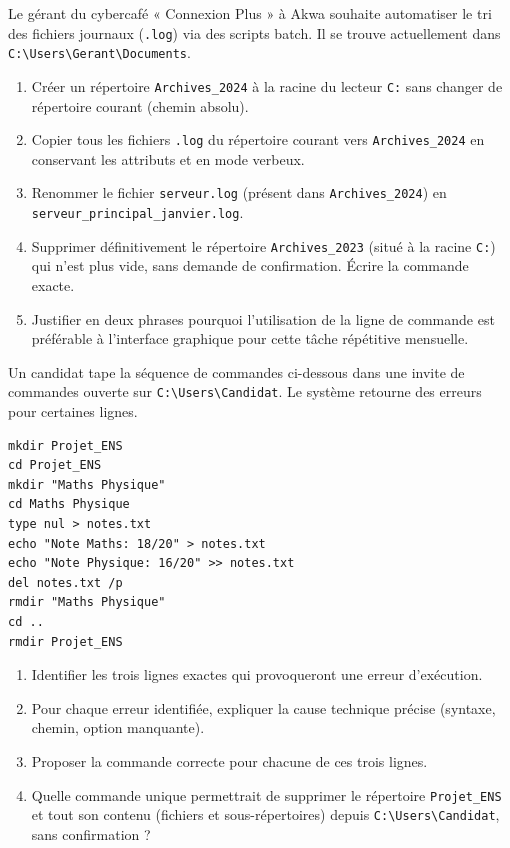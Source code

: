 \documentclass[11pt]{article}
\begin{document}
\begin{exercice}
Le gérant du cybercafé « Connexion Plus » à Akwa souhaite automatiser le tri des fichiers journaux (\texttt{.log}) via des scripts batch. Il se trouve actuellement dans \texttt{C:\textbackslash Users\textbackslash Gerant\textbackslash Documents}.
\begin{enumerate}
    \item Créer un répertoire \texttt{Archives\_2024} à la racine du lecteur \texttt{C:} sans changer de répertoire courant (chemin absolu).
    \item Copier tous les fichiers \texttt{.log} du répertoire courant vers \texttt{Archives\_2024} en conservant les attributs et en mode verbeux.
    \item Renommer le fichier \texttt{serveur.log} (présent dans \texttt{Archives\_2024}) en \texttt{serveur\_principal\_janvier.log}.
    \item Supprimer définitivement le répertoire \texttt{Archives\_2023} (situé à la racine \texttt{C:}) qui n'est plus vide, sans demande de confirmation. Écrire la commande exacte.
    \item Justifier en deux phrases pourquoi l'utilisation de la ligne de commande est préférable à l'interface graphique pour cette tâche répétitive mensuelle.
\end{enumerate}
\end{exercice}

\begin{exercice}
Un candidat tape la séquence de commandes ci-dessous dans une invite de commandes ouverte sur \texttt{C:\textbackslash Users\textbackslash Candidat}. Le système retourne des erreurs pour certaines lignes.
\begin{verbatim}
mkdir Projet_ENS
cd Projet_ENS
mkdir "Maths Physique"
cd Maths Physique
type nul > notes.txt
echo "Note Maths: 18/20" > notes.txt
echo "Note Physique: 16/20" >> notes.txt
del notes.txt /p
rmdir "Maths Physique"
cd ..
rmdir Projet_ENS
\end{verbatim}
\begin{enumerate}
    \item Identifier les trois lignes exactes qui provoqueront une erreur d'exécution.
    \item Pour chaque erreur identifiée, expliquer la cause technique précise (syntaxe, chemin, option manquante).
    \item Proposer la commande correcte pour chacune de ces trois lignes.
    \item Quelle commande unique permettrait de supprimer le répertoire \texttt{Projet\_ENS} et tout son contenu (fichiers et sous-répertoires) depuis \texttt{C:\textbackslash Users\textbackslash Candidat}, sans confirmation ?
\end{enumerate}
\end{exercice}
\end{document}
